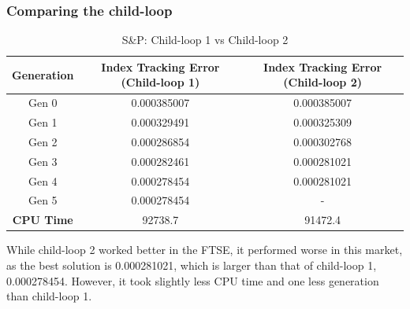 \documentclass[12pt]{report}
\begin{document}
\subsubsection*{Comparing the child-loop}
\begin{table}[H]
\centering
\begin{tabular}{| c | c | c |} 
\hline \rowcolor{lightgray}
\textbf{Generation} & \textbf{Index Tracking Error (Child-loop 1)} & \textbf{Index Tracking Error (Child-loop 2)} \\
\hline
Gen 0 & 0.000385007 & 0.000385007\\ \hline
Gen 1 & 0.000329491 & 0.000325309\\ \hline
Gen 2 & 0.000286854 & 0.000302768\\ \hline
Gen 3 & 0.000282461 & 0.000281021\\ \hline
Gen 4 & 0.000278454 & 0.000281021\\ \hline
Gen 5 & 0.000278454 & - \\ \hline
\textbf{CPU Time} & 92738.7 & 91472.4\\ \hline
\end{tabular}
\caption{S\&P: Child-loop 1 vs Child-loop 2}
\label{table:s&pchild}
\end{table}
\noindent
While child-loop 2 worked better in the FTSE, it performed worse in this market, as the best solution is 0.000281021, which is larger than that of child-loop 1, 0.000278454. However, it took slightly less CPU time and one less generation than child-loop 1.
\end{document}
